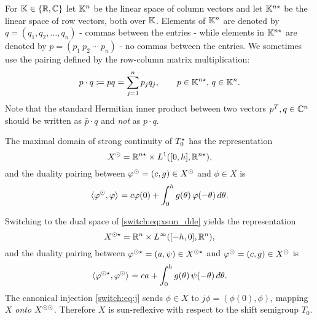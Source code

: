 \begin{remark}[Notation]\label{switch:rem:dotnotation}
For $\mathbb{K} \in \{\mathbb{R}, \mathbb{C}\}$ let $\mathbb{K}^n$ be the linear space of column vectors and let $\mathbb{K}^{n\star}$ be the linear space of row vectors, both over $\mathbb{K}$. Elements of $\mathbb{K}^n$ are denoted by $q = (q_1,q_2,\ldots,q_n)$ - commas between the entries - while elements in $\mathbb{K}^{n\star}$ are denoted by $p = (p_1 ~ p_2 ~ \cdots ~ p_n)$ - no commas between the entries. We sometimes use the pairing defined by the row-column matrix multiplication:
%
\[
p \cdot q \coloneqq pq = \sum_{j=1}^n p_jq_j, \qquad p \in \mathbb{K}^{n\star},\, q \in \mathbb{K}^n.
\]
Note that the standard Hermitian inner product between two vectors $p^T,q \in \mathbb{C}^n$ should be written as $\bar{p} \cdot q$ and {\em not} as $p\cdot q$.
\end{remark}

\begin{description}[wide]
\item[On $\SUN{X}$:]
  The maximal domain of strong continuity of $T_0^{\star}$ has the representation
  \begin{equation}
    \label{switch:eq:xsun_dde}
    X^{\odot} = \mathbb{R}^{n\star} \times L^1([0,h],\mathbb{R}^{n\star}),
  \end{equation}
  and the duality pairing between $\varphi^{\odot} = (c,g) \in X^{\odot}$ and $\phi \in X$ is
  \begin{equation}
    \label{switch:eq:pairing_X_sun_X}
    \langle \varphi^{\odot},\varphi \rangle_{} = c\varphi(0)+ \int_{0}^{h}g(\theta)\,\varphi(-\theta)\,d\theta.
  \end{equation}
\item[On $\SUNSTAR{X}$:]
  Switching to the dual space of \cref{switch:eq:xsun_dde} yields the representation
  \[
    X^{\odot\star} = \mathbb{R}^n \times L^\infty([-h,0], \mathbb{R}^n),
  \]
  and the duality pairing between $\varphi^{\odot\star} = (a,\psi) \in X^{\odot\star}$ and $\varphi^{\odot} = (c,g) \in X^{\odot}$ is
  \begin{equation}
    \label{switch:eq:pairing_X_sun_star_X_sun}
    \langle \varphi^{\odot\star},\varphi^{\odot} \rangle_{} = ca + \int_{0}^{h}g(\theta)\,\psi(-\theta)\,d\theta.
  \end{equation}
  The canonical injection \cref{switch:eq:j} sends $\phi \in X$ to $j\phi = (\phi(0), \phi)$,  mapping $X$ \emph{onto} $X^{\odot\odot}$. Therefore $X$ is sun-reflexive with respect to the shift semigroup $T_0$.
\end{description}

